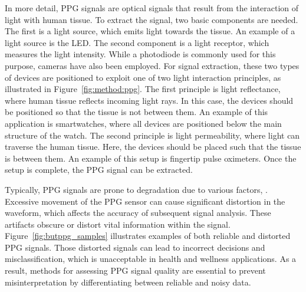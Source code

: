 In more detail, \gls{PPG} signals are optical signals that result from the interaction of light with human tissue. To extract the signal, two basic components are needed. The first is a light source, which emits light towards the tissue. An example of a light source is the \gls{LED}. The second component is a light receptor, which measures the light intensity. While a photodiode is commonly used for this purpose, cameras have also been employed. For signal extraction, these two types of devices are positioned to exploit one of two light interaction principles, as illustrated in Figure~\ref{fig:method:ppg}. The first principle is light reflectance, where human tissue reflects incoming light rays. In this case, the devices should be positioned so that the tissue is not between them. An example of this application is smartwatches, where all devices are positioned below the main structure of the watch. The second principle is light permeability, where light can traverse the human tissue. Here, the devices should be placed such that the tissue is between them. An example of this setup is fingertip pulse oximeters. Once the setup is complete, the \gls{PPG} signal can be extracted. 



Typically, \gls{PPG} signals are prone to degradation due to various factors,  \cite{ppg-1}. Excessive movement of the \gls{PPG} sensor can cause significant distortion in the waveform, which affects the accuracy of subsequent signal analysis. These artifacts obscure or distort vital information within the signal. Figure~\ref{fig:butppg_samples} illustrates examples of both reliable and distorted \gls{PPG} signals.  Those distorted signals can lead to incorrect decisions and misclassification, which is unacceptable in health and wellness applications. As a result, methods for assessing \gls{PPG} signal quality are essential to prevent misinterpretation by differentiating between reliable and noisy data.

